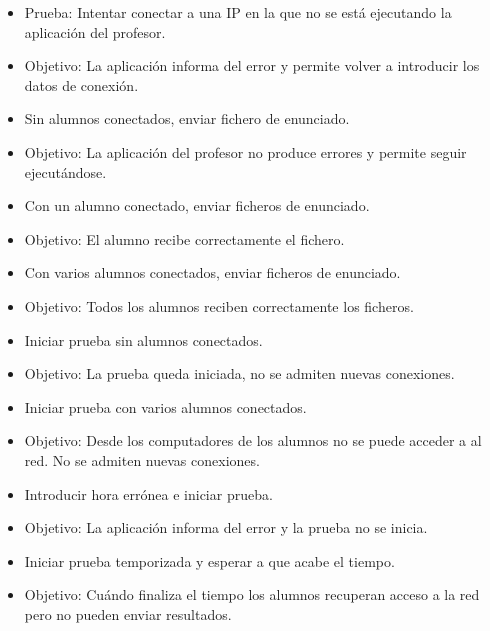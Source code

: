 \begin{itemize}

    \item Prueba: Intentar conectar a una IP en la que no se está ejecutando la aplicación del profesor.
    \item Objetivo: La aplicación informa del error y permite volver a introducir los datos de conexión.
    \newline

    \item Sin alumnos conectados, enviar fichero de enunciado.
    \item Objetivo: La aplicación del profesor no produce errores y permite seguir ejecutándose.
    \newline

    \item Con un alumno conectado, enviar ficheros de enunciado.
    \item Objetivo: El alumno recibe correctamente el fichero.
    \newline

    \item Con varios alumnos conectados, enviar ficheros de enunciado.
    \item Objetivo: Todos los alumnos reciben correctamente los ficheros.
    \newline

    \item Iniciar prueba sin alumnos conectados.
    \item Objetivo: La prueba queda iniciada, no se admiten nuevas conexiones.
    \newline

    \item Iniciar prueba con varios alumnos conectados.
    \item Objetivo: Desde los computadores de los alumnos no se puede acceder a al red. No se admiten nuevas conexiones.
    \newline


    \item Introducir hora errónea e iniciar prueba.
    \item Objetivo: La aplicación informa del error y la prueba no se inicia.
    \newline

    \item Iniciar prueba temporizada y esperar a que acabe el tiempo.
    \item Objetivo: Cuándo finaliza el tiempo los alumnos recuperan acceso a la red pero no pueden enviar resultados.
    \newline


\end{itemize}

